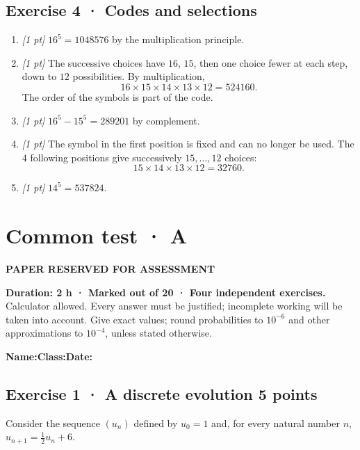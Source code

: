 \subsection*{Exercise 4 · Codes and selections}\begin{enumerate}

\item \textit{[1 pt]} $16^5=1048576$ by the multiplication principle.

\item \textit{[1 pt]} The successive choices have $16$, $15$, then one choice fewer at each step, down to $12$ possibilities. By multiplication,
\[16\times15\times14\times13\times12=524160.\]
The order of the symbols is part of the code.

\item \textit{[1 pt]} $16^5-15^5=289201$ by complement.

\item \textit{[1 pt]} The symbol in the first position is fixed and can no longer be used. The $4$ following positions give successively $15,\ldots,12$ choices:
\[15\times14\times13\times12=32760.\]

\item \textit{[1 pt]} $14^5=537824$.

\end{enumerate}

\fi

\ifprof

\clearpage{}\label{sujet:3-3}

\section*{Common test · A}

{\sffamily\bfseries\color{amber}PAPER RESERVED FOR ASSESSMENT\par}

\textbf{Duration: 2 h · Marked out of 20 · Four independent exercises.}\\Calculator allowed. Every answer must be justified; incomplete working will be taken into account. Give exact values; round probabilities to $10^{-6}$ and other approximations to $10^{-4}$, unless stated otherwise.

\smallskip\textbf{Name:}\enspace\dotfill\quad\textbf{Class:}\enspace\dotfill\quad\textbf{Date:}\enspace\dotfill

\subsection*{Exercise 1 · A discrete evolution \hfill 5 points}Consider the sequence $(u_n)$ defined by $u_0=1$ and, for every natural number $n$, $u_{n+1}=\frac{1}{2}u_n+6$.

